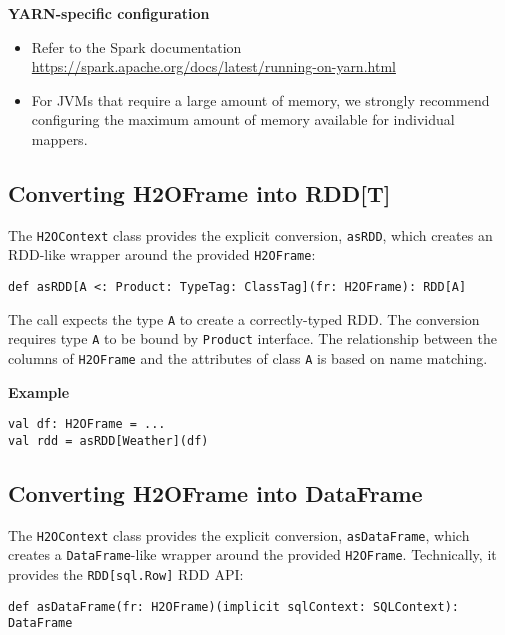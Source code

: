 \pagebreak
\textbf{YARN-specific configuration}

\begin{itemize}
\item Refer to the Spark documentation \url{https://spark.apache.org/docs/latest/running-on-yarn.html}
\item For JVMs that require a large amount of memory, we strongly recommend configuring the maximum amount of memory available for individual mappers.
 \end{itemize} 
 
 \subsection{Converting H2OFrame into RDD[T]}
 
 The \texttt{H2OContext} class provides the explicit conversion, \texttt{asRDD}, which creates an RDD-like wrapper around the provided \texttt{H2OFrame}:

\begin{lstlisting}[style=Scala]
def asRDD[A <: Product: TypeTag: ClassTag](fr: H2OFrame): RDD[A]
\end{lstlisting}

The call expects the type \texttt{A} to create a correctly-typed RDD. The conversion requires type \texttt{A} to be bound by \texttt{Product} interface. The relationship between the columns of \texttt{H2OFrame} and the attributes of class \texttt{A} is based on name matching.

\textbf{Example}

\begin{lstlisting}[style=Scala]
val df: H2OFrame = ...
val rdd = asRDD[Weather](df)
\end{lstlisting}

\subsection{Converting H2OFrame into DataFrame}

The \texttt{H2OContext} class provides the explicit conversion, \texttt{asDataFrame}, which creates a \texttt{DataFrame}-like wrapper around the provided \texttt{H2OFrame}. Technically, it provides the \texttt{RDD[sql.Row]} RDD API:

\begin{lstlisting}[style=Scala]
def asDataFrame(fr: H2OFrame)(implicit sqlContext: SQLContext): DataFrame
\end{lstlisting}

